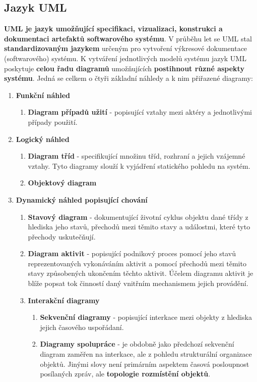 \subsection{Jazyk UML}
\textbf{UML je jazyk umožňující specifikaci, vizualizaci, konstrukci a dokumentaci artefaktů softwarového systému}. V průběhu let se UML stal \textbf{standardizovaným jazykem }určeným pro vytvoření výkresové dokumentace (softwarového) systému. K vytváření jednotlivých modelů systému jazyk UML poskytuje \textbf{celou řadu diagramů} umožňujících \textbf{postihnout různé aspekty systému}.  Jedná se celkem o čtyři základní náhledy a k nim přiřazené diagramy: 

\begin{enumerate}
\item \textbf{Funkční náhled}
\begin{enumerate}
\item \textbf{Diagram případů užití} - popisující vztahy mezi aktéry a jednotlivými případy použití. 
\end{enumerate}
\item \textbf{Logický náhled}
\begin{enumerate}
\item \textbf{Diagram tříd} - specifikující množinu tříd, rozhraní a jejich vzájemné vztahy. Tyto diagramy slouží k vyjádření statického pohledu na systém.
\item \textbf{Objektový diagram}
\end{enumerate}
\item \textbf{Dynamický náhled popisující chování}
\begin{enumerate}
\item \textbf{Stavový diagram} - dokumentující životní cyklus objektu dané třídy z hlediska jeho stavů, přechodů mezi těmito stavy a událostmi, které tyto přechody uskutečňují. 
\item \textbf{Diagram aktivit} -  popisující podnikový proces pomocí jeho stavů reprezentovaných vykonáváním aktivit a pomocí přechodů mezi těmito stavy způsobených ukončením těchto aktivit. Účelem diagramu aktivit je blíže popsat tok činností daný vnitřním
mechanismem jejich provádění. 
\item \textbf{Interakční diagramy}
\begin{enumerate}
\item \textbf{Sekvenční diagramy} -  popisující interkace mezi objekty z hlediska jejich časového uspořádaní.
\item \textbf{Diagramy spolupráce} -  je obdobně jako předchozí sekvenční diagram zaměřen na interkace, ale z pohledu strukturální organizace objektů. Jinými slovy není primárním aspektem časová posloupnost posílaných zpráv, ale \textbf{topologie rozmístění objektů}. 

\end{enumerate}
\end{enumerate}
\end{enumerate}
